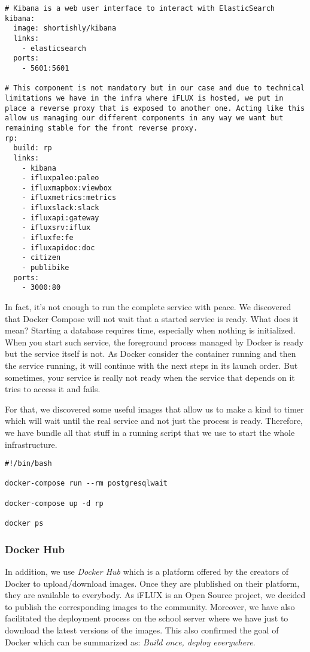 \begin{lstlisting}
# Kibana is a web user interface to interact with ElasticSearch
kibana:
  image: shortishly/kibana
  links:
    - elasticsearch
  ports:
    - 5601:5601

# This component is not mandatory but in our case and due to technical limitations we have in the infra where iFLUX is hosted, we put in place a reverse proxy that is exposed to another one. Acting like this allow us managing our different components in any way we want but remaining stable for the front reverse proxy.
rp:
  build: rp
  links:
    - kibana
    - ifluxpaleo:paleo
    - ifluxmapbox:viewbox
    - ifluxmetrics:metrics
    - ifluxslack:slack
    - ifluxapi:gateway
    - ifluxsrv:iflux
    - ifluxfe:fe
    - ifluxapidoc:doc
    - citizen
    - publibike
  ports:
    - 3000:80
\end{lstlisting}

In fact, it's not enough to run the complete service with peace. We discovered that Docker Compose will not wait that a started service is ready. What does it mean? Starting a database requires time, especially when nothing is initialized. When you start such service, the foreground process managed by Docker is ready but the service itself is not. As Docker consider the container running and then the service running, it will continue with the next steps in its launch order. But sometimes, your service is really not ready when the service that depends on it tries to access it and fails.

For that, we discovered some useful images that allow us to make a kind to timer which will wait until the real service and not just the process is ready. Therefore, we have bundle all that stuff in a running script that we use to start the whole infrastructure.

\begin{lstlisting}
#!/bin/bash

docker-compose run --rm postgresqlwait

docker-compose up -d rp

docker ps
\end{lstlisting}

\subsubsection{Docker Hub}

In addition, we use \emph{Docker Hub} which is a platform offered by the creators of Docker to upload/download images. Once they are plublished on their platform, they are available to everybody. As iFLUX is an Open Source project, we decided to publish the corresponding images to the community. Moreover, we have also facilitated the deployment process on the school server where we have just to download the latest versions of the images. This also confirmed the goal of Docker which can be summarized as: \emph{Build once, deploy everywhere}.

